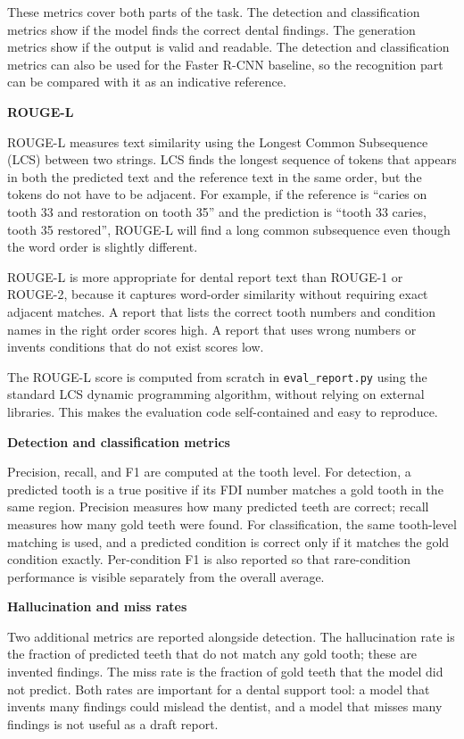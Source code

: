 \documentclass[a4paper,12pt]{report}
\newcommand{\minisection}[1]{%
  \vspace{1ex}
  \noindent\textbf{#1}\par
  \vspace{0.5ex}
}
\begin{document}
These metrics cover both parts of the task. The detection and classification metrics show if the model finds the correct dental findings. The generation metrics show if the output is valid and readable. The detection and classification metrics can also be used for the Faster R-CNN baseline, so the recognition part can be compared with it as an indicative reference.

\minisection{ROUGE-L}

ROUGE-L measures text similarity using the Longest Common Subsequence (LCS) between two strings. LCS finds the longest sequence of tokens that appears in both the predicted text and the reference text in the same order, but the tokens do not have to be adjacent. For example, if the reference is ``caries on tooth 33 and restoration on tooth 35'' and the prediction is ``tooth 33 caries, tooth 35 restored'', ROUGE-L will find a long common subsequence even though the word order is slightly different.

ROUGE-L is more appropriate for dental report text than ROUGE-1 or ROUGE-2, because it captures word-order similarity without requiring exact adjacent matches. A report that lists the correct tooth numbers and condition names in the right order scores high. A report that uses wrong numbers or invents conditions that do not exist scores low.

The ROUGE-L score is computed from scratch in \texttt{eval\_report.py} using the standard LCS dynamic programming algorithm, without relying on external libraries. This makes the evaluation code self-contained and easy to reproduce.

\minisection{Detection and classification metrics}

Precision, recall, and F1 are computed at the tooth level. For detection, a predicted tooth is a true positive if its FDI number matches a gold tooth in the same region. Precision measures how many predicted teeth are correct; recall measures how many gold teeth were found. For classification, the same tooth-level matching is used, and a predicted condition is correct only if it matches the gold condition exactly. Per-condition F1 is also reported so that rare-condition performance is visible separately from the overall average.

\minisection{Hallucination and miss rates}

Two additional metrics are reported alongside detection. The hallucination rate is the fraction of predicted teeth that do not match any gold tooth; these are invented findings. The miss rate is the fraction of gold teeth that the model did not predict. Both rates are important for a dental support tool: a model that invents many findings could mislead the dentist, and a model that misses many findings is not useful as a draft report.
\end{document}
